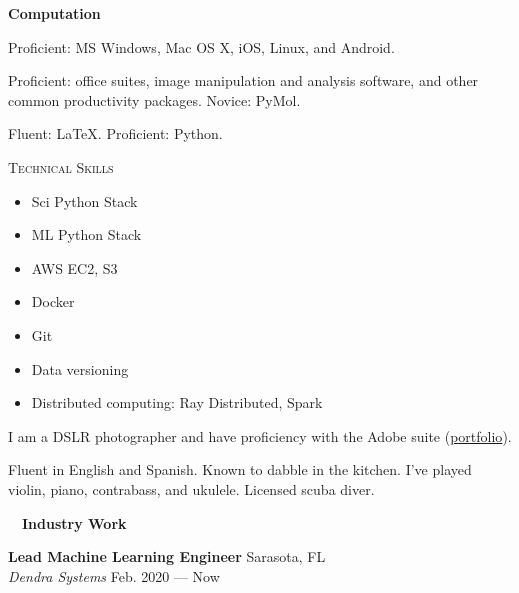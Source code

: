 \documentclass[a4paper,12pt]{article}
\newcommand{\resheading}[1]{{\hspace{-9pt} \colorbox{mygrey}{\begin{minipage}{\textwidth}{\textmd{~~\large \textbf{#1} \vphantom{p\^{E}}}}\end{minipage}}\vspace{6pt}} }
\newcommand{\ressubheading}[4]{{\begin{minipage}{\textwidth}
        \textbf{#1} \hfill #2 \\
        \textit{#3} \hfill #4 \\
        \end{minipage}}}
\begin{document}
    \textbf{Computation}
        \begin{description}\setlength{\itemsep}{0mm}
        \item[Operating Systems] Proficient: MS Windows, Mac OS X, iOS, Linux, and Android.
        \item[Software] Proficient: office suites, image manipulation and analysis software, and other common productivity packages. Novice: PyMol.
        \item[Programming] Fluent: \LaTeX. Proficient: Python.
        \end{description}

     \textsc{Technical Skills}\vspace*{-15pt}
        \begin{multicols}{2} \begin{itemize}[leftmargin=0.4cm]
        \item Sci Python Stack
        \item ML Python Stack
        \item AWS EC2, S3
        \item Docker
        \item Git
        \item Data versioning
        \item Distributed computing: Ray Distributed, Spark
        \end{itemize}
        \end{multicols}
        
        \begin{description}\setlength{\itemsep}{0mm}
        \item[Photography] I am a DSLR photographer and have proficiency with the Adobe suite (\href{https://www.flickr.com/photos/richarddecal/sets/72157640025469005/}{portfolio}).
        \item[Other] Fluent in English and Spanish. Known to dabble in the kitchen. I've played violin, piano, contrabass, and ukulele. Licensed scuba diver.
        \end{description}

\resheading{Industry Work}

\ressubheading{Lead Machine Learning Engineer}{Sarasota, FL}{Dendra Systems}{Feb. 2020 --- Now}
\end{document}
